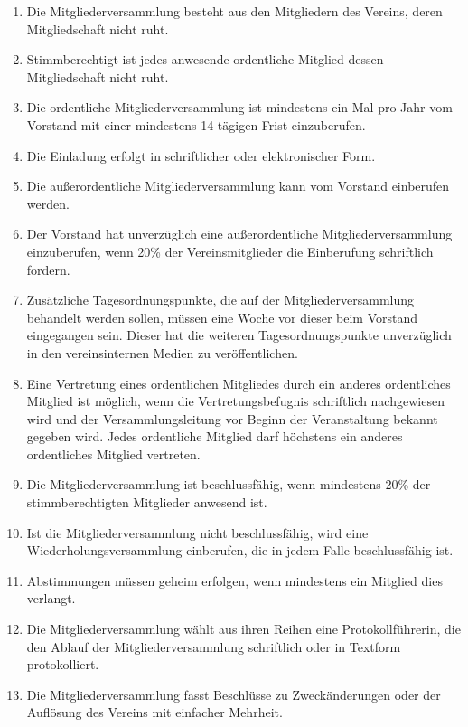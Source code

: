 \documentclass[a4paper, 12pt]{scrartcl}
\begin{document}
\begin{enumerate}
  \item Die Mitgliederversammlung besteht aus den Mitgliedern des Vereins, deren Mitgliedschaft nicht ruht.
  \item Stimmberechtigt ist jedes anwesende ordentliche Mitglied dessen Mitgliedschaft nicht ruht.
  \item Die ordentliche Mitgliederversammlung ist mindestens ein Mal pro Jahr vom Vorstand mit einer mindestens 14-tägigen Frist einzuberufen.
  \item Die Einladung erfolgt in schriftlicher oder elektronischer Form.
  \item Die außerordentliche Mitgliederversammlung kann vom Vorstand einberufen werden.
  \item Der Vorstand hat unverzüglich eine außerordentliche Mitgliederversammlung einzuberufen, wenn 20\% der Vereinsmitglieder die Einberufung schriftlich fordern.
  \item Zusätzliche Tagesordnungspunkte, die auf der Mitgliederversammlung behandelt werden sollen, müssen eine Woche vor dieser beim Vorstand eingegangen sein. Dieser hat die weiteren Tagesordnungspunkte unverzüglich in den vereinsinternen Medien zu veröffentlichen.
  \item Eine Vertretung eines ordentlichen Mitgliedes durch ein anderes ordentliches Mitglied ist möglich, wenn die Vertretungsbefugnis schriftlich nachgewiesen wird und der Versammlungsleitung vor Beginn der Veranstaltung bekannt gegeben wird. Jedes ordentliche Mitglied darf höchstens ein anderes ordentliches Mitglied vertreten.
  \item Die Mitgliederversammlung ist beschlussfähig, wenn mindestens 20\% der stimmberechtigten Mitglieder anwesend ist.
  \item Ist die Mitgliederversammlung nicht beschlussfähig, wird eine Wiederholungsversammlung einberufen, die in jedem Falle beschlussfähig ist.
  \item Abstimmungen müssen geheim erfolgen, wenn mindestens ein Mitglied dies verlangt.
  \item Die Mitgliederversammlung wählt aus ihren Reihen eine Protokollführerin, die den Ablauf der Mitgliederversammlung schriftlich oder in Textform protokolliert.
  \item Die Mitgliederversammlung fasst Beschlüsse zu Zweckänderungen oder der Auflösung des Vereins mit einfacher Mehrheit. %
\end{enumerate}
\end{document}
